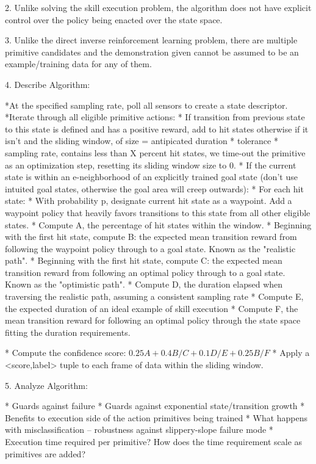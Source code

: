 \documentclass[letterpaper]{article}
\begin{document}
2. Unlike solving the skill execution problem, the algorithm does not have explicit control over the policy being enacted over the state space.

3. Unlike the direct inverse reinforcement learning problem, there are multiple primitive candidates and the demonstration given cannot be assumed to be an example/training data for any of them.

4. Describe Algorithm:

	*At the specified sampling rate, poll all sensors to create a state descriptor.
	*Iterate through all eligible primitive actions:
		* If transition from previous state to this state is defined and has a positive reward, add to hit states
		  otherwise if it isn't and the sliding window, of size = antipicated duration * tolerance * sampling rate, contains less
		  than X percent hit states, we time-out the primitive as an optimization step, resetting its sliding window size to 0.
		* If the current state is within an e-neighborhood of an explicitly trained goal state (don't use intuited goal states,
		  otherwise the goal area will creep outwards):
			* For each hit state:
				* With probability p, designate current hit state as a waypoint. Add a waypoint policy that heavily favors
				  transitions to this state from all other eligible states.
			* Compute A, the percentage of hit states within the window.
			* Beginning with the first hit state, compute B: the expected mean transition reward from following the waypoint policy through to a goal state. Known as the "realistic path".
			* Beginning with the first hit state, compute C: the expected mean transition reward from following an optimal policy through to a goal state. Known as the "optimistic path".
			* Compute D, the duration elapsed when traversing the realistic path, assuming a consistent sampling rate
			* Compute E, the expected duration of an ideal example of skill execution
			* Compute F, the mean transition reward for following an optimal policy through the state space fitting the duration requirements.

			* Compute the confidence score: $0.25A + 0.4B/C + 0.1D/E + 0.25B/F$
			* Apply a <score,label> tuple to each frame of data within the sliding window.



5. Analyze Algorithm:

	* Guards against failure
	* Guards against exponential state/transition growth
	* Benefits to execution side of the action primitives being trained
	* What happens with misclassification -- robustness against slippery-slope failure mode
	* Execution time required per primitive? How does the time requirement scale as primitives are added?
\end{document}
